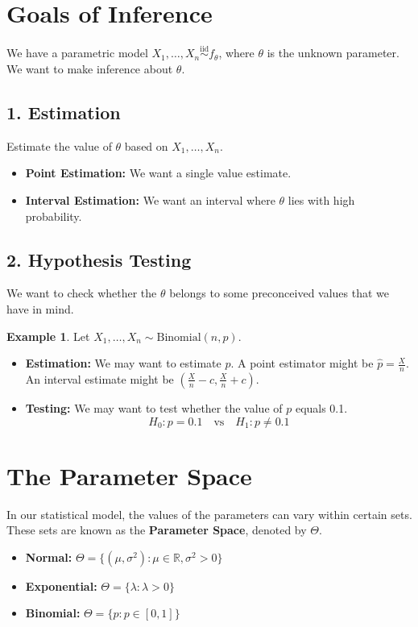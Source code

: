 \documentclass[12pt, a4paper]{article}
\theoremstyle{definition}
\newtheorem{example}{Example}
\newcommand{\R}{\mathbb{R}}
\newcommand{\iid}{\overset{\text{iid}}{\sim}}
\begin{document}
\section{Goals of Inference}
We have a parametric model $X_1, \dots, X_n \iid f_\theta$, where $\theta$ is the unknown parameter. We want to make inference about $\theta$.

\subsection{1. Estimation}
Estimate the value of $\theta$ based on $X_1, \dots, X_n$.
\begin{itemize}
    \item \textbf{Point Estimation:} We want a single value estimate.
    \item \textbf{Interval Estimation:} We want an interval where $\theta$ lies with high probability.
\end{itemize}

\subsection{2. Hypothesis Testing}
We want to check whether the $\theta$ belongs to some preconceived values that we have in mind.

\begin{example}
Let $X_1, \dots, X_n \sim \text{Binomial}(n, p)$.
\begin{itemize}
    \item \textbf{Estimation:} We may want to estimate $p$. A point estimator might be $\hat{p} = \frac{X}{n}$. An interval estimate might be $(\frac{X}{n} - c, \frac{X}{n} + c)$.
    \item \textbf{Testing:} We may want to test whether the value of $p$ equals 0.1.
    $$ H_0: p = 0.1 \quad \text{vs} \quad H_1: p \neq 0.1 $$
\end{itemize}
\end{example}

\section{The Parameter Space}
In our statistical model, the values of the parameters can vary within certain sets. These sets are known as the \textbf{Parameter Space}, denoted by $\Theta$.
\begin{itemize}
    \item \textbf{Normal:} $\Theta = \{(\mu, \sigma^2) : \mu \in \R, \sigma^2 > 0\}$
    \item \textbf{Exponential:} $\Theta = \{\lambda : \lambda > 0\}$
    \item \textbf{Binomial:} $\Theta = \{p : p \in [0, 1]\}$
\end{itemize}
\end{document}
